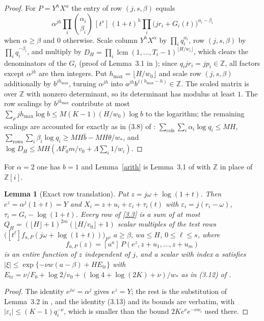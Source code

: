 \documentclass[11pt]{amsart}
\newtheorem{lemma}{Lemma}[section]
\newcommand{\Z}{\mathbb{Z}}
\newcommand{\eps}{\varepsilon}
\begin{document}
\begin{proof}
For $P=Y^hX^\alpha$ the entry of row $(j,s,\beta)$ equals
\[
\alpha^{jh}\prod_i\binom{\alpha_i}{\beta_i}\,[t^s]\,(1+t)^h\prod_i\bigl(jr_i+G_i(t)\bigr)^{\alpha_i-\beta_i}
\]
when $\alpha\ge\beta$ and $0$ otherwise. Scale column $Y^hX^\alpha$ by $\prod_iq_i^{\alpha_i}$, row $(j,s,\beta)$ by $\prod_iq_i^{-\beta_i}$, and multiply by $D_H=\prod_i\operatorname{lcm}(1,\dots,T_i-1)^{\lfloor H/w_i\rfloor}$, which clears the denominators of the $G_i$ (proof of Lemma~3.1 in \cite{OAI}); since $q_ijr_i=jp_i\in\Z$, all factors except $\alpha^{jh}$ are then integers. Put $h_{\max}=\lfloor H/w_0\rfloor$ and scale row $(j,s,\beta)$ additionally by $b^{jh_{\max}}$, turning $\alpha^{jh}$ into $a^{jh}b^{j(h_{\max}-h)}\in\Z$. The scaled matrix is over $\Z$ with nonzero determinant, so its determinant has modulus at least $1$. The row scalings by $b^{jh_{\max}}$ contribute at most $\sum_\rho jh_{\max}\log b\le M(K-1)(H/w_0)\log b$ to the logarithm; the remaining scalings are accounted for exactly as in (3.8) of \cite{OAI}: $\sum_{\text{cols}}\sum_i\alpha_i\log q_i\le MH$, $\sum_{\text{rows}}\sum_i\beta_i\log q_i\ge MH\bar b-MH\theta/w_*$, and $\log D_H\le MH(\Lambda F_0m/v_0+\Lambda\sum_i1/w_i)$.
\end{proof}

For $\alpha=2$ one has $b=1$ and Lemma~\ref{arith} is Lemma~3.1 of \cite{OAI} with $\Z$ in place of $\Z[i]$.

\begin{lemma}[Exact row translation]\label{transl}
Put $z=j\omega+\log(1+t)$. Then $e^z=\alpha^j(1+t)=Y$ and $X_i=z+u_i+\eps_i+\tau_i(t)$ with $\eps_i=j(r_i-\omega)$, $\tau_i=G_i-\log(1+t)$. Every row of \eqref{3.3} is a sum of at most $Q_H=(\lfloor H\rfloor+1)^{2m}(\lfloor H/v_0\rfloor+1)$ scalar multiples of the test rows $\bigl([t^\ell]f_{a,P}(j\omega+\log(1+t))\bigr)_P$, $a\ge\beta$, $wa\le H$, $0\le\ell\le s$, where
\[
f_{a,P}(z)=[u^a]\,P(e^z,z+u_1,\dots,z+u_m)
\]
is an entire function of $z$ independent of $j$, and a scalar with index $a$ satisfies $|\xi|\le\exp\{-\nu w(a-\beta)+HE_{\mathrm{tr}}\}$ with $E_{\mathrm{tr}}=\nu/F_0+\log2/v_0+(\log4+\log(2K)+\nu)/w_*$ as in (3.12) of \cite{OAI}.
\end{lemma}

\begin{proof}
The identity $e^{j\omega}=\alpha^j$ gives $e^z=Y$; the rest is the substitution of Lemma~3.2 in \cite{OAI}, and the identity (3.13) and its bounds are verbatim, with $|\eps_i|\le(K-1)q_i^{-\nu}$, which is smaller than the bound $2Ke^\nu e^{-\nu w_i}$ used there.
\end{proof}
\end{document}

